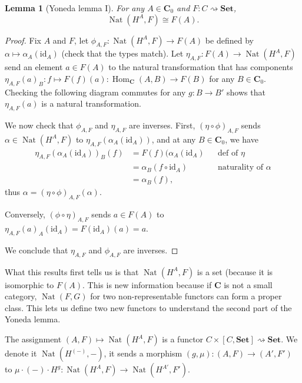 \documentclass{article}
\newtheorem{lem}[thm]{Lemma}
\theoremstyle{definition}
\theoremstyle{remark}
\DeclareMathOperator{\Hom}{Hom}
\DeclareMathOperator{\Nat}{Nat}
\newcommand{\id}{\text{id}}
\begin{document}
\begin{lem}[Yoneda lemma I]
	For any $A \in \mathbf{C}_0$ and $F: C\rightsquigarrow \textbf{Set}$,
	\[\Nat(H^A, F) \cong F(A).\]
\end{lem} 
\begin{proof}
	Fix $A$ and $F$, let $\phi_{A,F}: \Nat(H^A, F) \rightarrow F(A)$ be defined by $\alpha \mapsto \alpha_A(\id_A)$ (check that the types match). Let $\eta_{A,F}: F(A) \rightarrow \Nat(H^A,F)$ send an element $a \in F(A)$ to the natural transformation that has components $\eta_{A,F}(a)_B: f \mapsto F(f)(a): \Hom_{\mathbf{C}}(A,B) \rightarrow F(B)$ for any $B \in \mathbf{C}_0$. Checking the following diagram commutes for any $g:B\rightarrow B'$ shows that $\eta_{A,F}(a)$ is a natural transformation.
	\begin{figure}[h]
		\centering
	\end{figure}

	We now check that $\phi_{A,F}$ and $\eta_{A,F}$ are inverses. First,
	$(\eta \circ \phi)_{A,F}$ sends $\alpha\in \Nat(H^A,F)$ to $\eta_{A,F}(\alpha_A(\id_A))$, and at any $B \in \mathbf{C}_0$, we have 
	\begin{align*}
		\eta_{A,F}(\alpha_A(\id_A))_B(f) &= F(f)(\alpha_A(\id_A)&&\mbox{def of $\eta$}\\
		&= \alpha_B(f \circ \id_A) &&\mbox{naturality of $\alpha$}\\
		&= \alpha_B(f),
	\end{align*}
	thus $\alpha = (\eta \circ \phi)_{A,F}(\alpha)$.
	
	Conversely, $(\phi\circ \eta)_{A,F}$ sends $a \in F(A)$ to $\eta_{A,F}(a)_A(\id_A) = F(\id_A)(a) = a$.
	
	We conclude that $\eta_{A,F}$ and $\phi_{A,F}$ are inverses.
\end{proof}
What this results first tells us is that $\Nat(H^A, F)$ is a set (because it is isomorphic to $F(A)$. This is new information because if $\mathbf{C}$ is not a small category, $\Nat(F,G)$ for two non-representable functors can form a proper class. This lets us define two new functors to understand the second part of the Yoneda lemma.

The assignment $(A,F) \mapsto \Nat(H^A,F)$ is a functor $C \times [C,\textbf{Set}] \rightsquigarrow \textbf{Set}$. We denote it $\Nat(H^{(-)}, -)$, it sends a morphism $(g,\mu): (A,F) \rightarrow (A',F')$ to $\mu \cdot (-) \cdot H^g:\Nat(H^A,F) \rightarrow \Nat(H^{A'},F')$.
\end{document}
